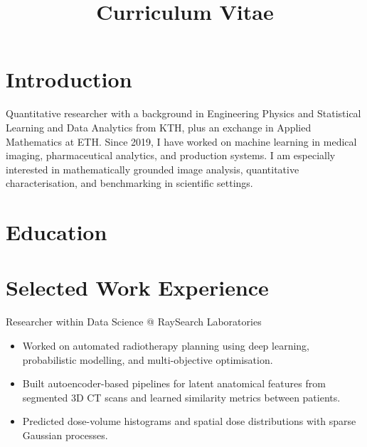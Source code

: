 \documentclass[11pt,a4paper]{moderncv}
\title{Curriculum Vitae}
\begin{document}
\makecvtitle

\section*{Introduction}
Quantitative researcher with a background in Engineering Physics and Statistical Learning and Data Analytics from KTH, plus an exchange in Applied Mathematics at ETH. Since 2019, I have worked on machine learning in medical imaging, pharmaceutical analytics, and production systems. I am especially interested in mathematically grounded image analysis, quantitative characterisation, and benchmarking in scientific settings.

\section{Education}




\section{Selected Work Experience}

\large{Researcher within Data Science @ RaySearch Laboratories}
\normalsize
\begin{itemize}
\item Worked on automated radiotherapy planning using deep learning, probabilistic modelling, and multi-objective optimisation.
\item Built autoencoder-based pipelines for latent anatomical features from segmented 3D CT scans and learned similarity metrics between patients.
\item Predicted dose-volume histograms and spatial dose distributions with sparse Gaussian processes.
\end{itemize}
\end{document}
